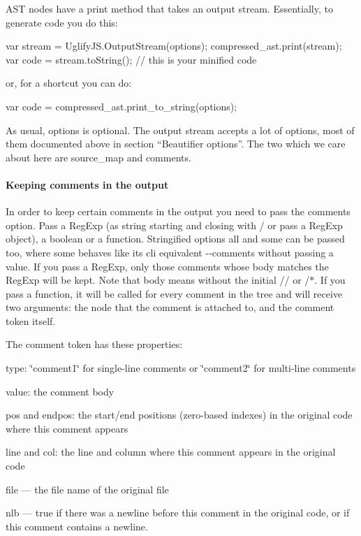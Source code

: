 A\+ST nodes have a {\ttfamily print} method that takes an output stream. Essentially, to generate code you do this\+: 
\begin{DoxyCode}
var stream = UglifyJS.OutputStream(options);
compressed\_ast.print(stream);
var code = stream.toString(); // this is your minified code
\end{DoxyCode}


or, for a shortcut you can do\+: 
\begin{DoxyCode}
var code = compressed\_ast.print\_to\_string(options);
\end{DoxyCode}


As usual, {\ttfamily options} is optional. The output stream accepts a lot of options, most of them documented above in section “\+Beautifier options”. The two which we care about here are {\ttfamily source\+\_\+map} and {\ttfamily comments}.

\paragraph*{Keeping comments in the output}

In order to keep certain comments in the output you need to pass the {\ttfamily comments} option. Pass a Reg\+Exp (as string starting and closing with {\ttfamily /} or pass a Reg\+Exp object), a boolean or a function. Stringified options {\ttfamily all} and {\ttfamily some} can be passed too, where {\ttfamily some} behaves like it\textquotesingle{}s cli equivalent {\ttfamily -\/-\/comments} without passing a value. If you pass a Reg\+Exp, only those comments whose body matches the Reg\+Exp will be kept. Note that body means without the initial {\ttfamily //} or {\ttfamily /$\ast$}. If you pass a function, it will be called for every comment in the tree and will receive two arguments\+: the node that the comment is attached to, and the comment token itself.

The comment token has these properties\+:


\begin{DoxyItemize}
\item {\ttfamily type}\+: \char`\"{}comment1\char`\"{} for single-\/line comments or \char`\"{}comment2\char`\"{} for multi-\/line comments
\item {\ttfamily value}\+: the comment body
\item {\ttfamily pos} and {\ttfamily endpos}\+: the start/end positions (zero-\/based indexes) in the original code where this comment appears
\item {\ttfamily line} and {\ttfamily col}\+: the line and column where this comment appears in the original code
\item {\ttfamily file} — the file name of the original file
\item {\ttfamily nlb} — true if there was a newline before this comment in the original code, or if this comment contains a newline.
\end{DoxyItemize}

